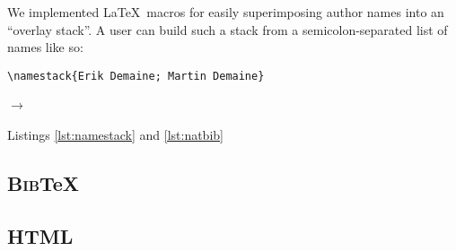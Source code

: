 \documentclass[natbib,authoryear]{sigtbd17-style}
\begin{document}
We implemented \LaTeX\ macros for easily superimposing author names
into an ``overlay stack''.
A user can build such a stack from a semicolon-separated list of names
like so:

\begin{center}
  \lstinline|\namestack{Erik Demaine; Martin Demaine}|

  $\to$ ~
\end{center}

Listings \ref{lst:namestack} and \ref{lst:natbib}




\subsection{\textsc{Bib}\TeX}

\subsection{HTML}



%
\end{document}
